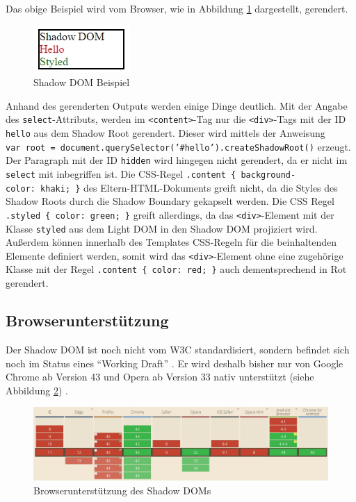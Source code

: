 Das obige Beispiel wird vom Browser, wie in Abbildung \ref{fig:shadowdombeispiel} dargestellt, gerendert.

\begin{figure}[htbp]
 \centering
 \includegraphics{kapitel2/bilder/3-shadow-dom-beispiel}
 \caption{Shadow DOM Beispiel}
 \label{fig:shadowdombeispiel}
\end{figure}

Anhand des gerenderten Outputs werden einige Dinge deutlich. Mit der Angabe des \texttt{select}-Attributs, werden im \texttt{\textless{}content\textgreater{}}-Tag nur die \texttt{\textless{}div\textgreater{}}-Tags mit der ID \texttt{hello} aus dem Shadow Root gerendert. Dieser wird mittels der Anweisung \texttt{var\ root\ =\ document.querySelector('\#hello').createShadowRoot()} erzeugt. Der Paragraph mit der ID \texttt{hidden} wird hingegen nicht gerendert, da er nicht im \texttt{select} mit inbegriffen ist. Die \ac{CSS}-Regel \texttt{.content\ \{\ background-color:\ khaki;\ \}} des Eltern-\ac{HTML}-Dokuments greift nicht, da die Styles des Shadow Roots durch die Shadow Boundary gekapselt werden. Die \ac{CSS} Regel \texttt{.styled\ \{\ color:\ green;\ \}} greift allerdings, da das \texttt{\textless{}div\textgreater{}}-Element mit der Klasse \texttt{styled} aus dem Light \ac{DOM} in den Shadow \ac{DOM} projiziert wird. Außerdem können innerhalb des Templates CSS-Regeln für die beinhaltenden Elemente definiert werden, somit wird das \texttt{\textless{}div\textgreater{}}-Element ohne eine zugehörige Klasse mit der Regel \texttt{.content\ \{\ color:\ red;\ \}} auch dementsprechend in Rot gerendert.


\subsection{Browserunterstützung}\label{shadow-dom-browserunterstuetzung}

Der Shadow \ac{DOM} ist noch nicht vom \ac{W3C} standardisiert, sondern befindet sich noch im Status eines ``Working Draft'' \cite{citeulike:13879687}. Er wird deshalb bisher nur von Google Chrome ab Version 43 und Opera ab Version 33 nativ unterstützt (siehe Abbildung \ref{fig:shadowdombrowser}) \cite{citeulike:13883407}.

\begin{figure}[htbp]
 \centering
 \includegraphics[width=\linewidth]{kapitel2/bilder/3-shadow-dom-browserunterstuetzung}
 \caption{Browserunterstützung des Shadow DOMs}
 \label{fig:shadowdombrowser}
\end{figure}
